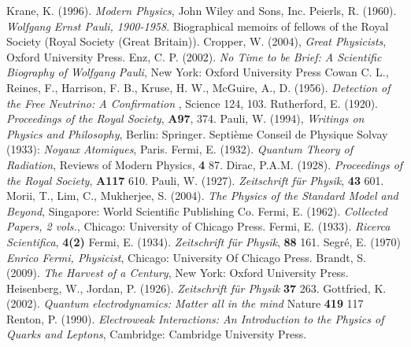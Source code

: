 \documentclass[a4paper,12pt]{book}
\begin{document}
\begin{thebibliography}{widest-label}
       Krane, K. (1996). \emph{Modern Physics}, John Wiley and Sons, Inc.
      Peierls, R. (1960). \emph{Wolfgang Ernst Pauli, 1900-1958}. Biographical memoirs of fellows of the Royal Society (Royal Society (Great Britain)).
      Cropper, W. (2004), \emph{Great Physicists}, Oxford University Press.
      Enz, C. P. (2002). \emph{No Time to be Brief: A Scientific Biography of Wolfgang Pauli}, New York: Oxford University Press
      Cowan C. L., Reines, F., Harrison, F. B., Kruse, H. W., McGuire, A., D. (1956). \emph{Detection of the Free Neutrino: A Confirmation }, Science 124, 103. 
      Rutherford, E. (1920). \emph{Proceedings of the Royal Society}, \textbf{A97}, 374.
      Pauli, W. (1994), \emph{Writings on Physics and Philosophy}, Berlin: Springer.
      Septi\`{e}me Conseil de Physique Solvay (1933): \emph{Noyaux Atomiques}, Paris.
      Fermi, E. (1932). \emph{Quantum Theory of Radiation}, Reviews of Modern Physics, \textbf{4} 87.
      Dirac, P.A.M. (1928). \emph{Proceedings of the Royal Society}, \textbf{A117} 610.
      Pauli, W. (1927). \emph{Zeitschrift f\"{u}r Physik}, \textbf{43} 601.
      Morii, T., Lim, C., Mukherjee, S. (2004). \emph{The Physics of the Standard Model and Beyond}, Singapore: World Scientific Publishing Co.
      Fermi, E. (1962). \emph{Collected Papers, 2 vols.}, Chicago: University of Chicago Press.
      Fermi, E. (1933). \emph{Ricerca Scientifica}, \textbf{4(2)}
      Fermi, E. (1934). \emph{Zeitschrift f\"{u}r Physik}, \textbf{88} 161.
      Segr\'{e}, E. (1970) \emph{Enrico Fermi, Physicist}, Chicago: University Of Chicago Press.
      Brandt, S. (2009). \emph{The Harvest of a Century}, New York: Oxford University Press.
      Heisenberg, W., Jordan, P. (1926). \emph{Zeitschrift f\"{u}r Physik} \textbf{37} 263.
      Gottfried, K. (2002). \emph{Quantum electrodynamics: Matter all in the mind} Nature \textbf{419} 117
       Renton, P. (1990). \emph{Electroweak Interactions: An Introduction to the Physics of Quarks and Leptons}, Cambridge: Cambridge University Press.


\end{thebibliography}
\end{document}
